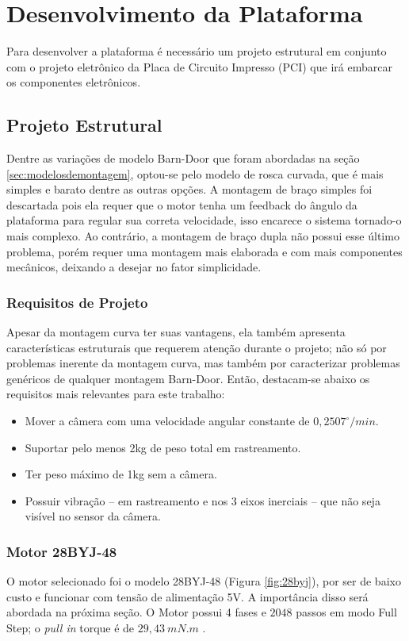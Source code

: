 \chapter{Desenvolvimento da Plataforma}

Para desenvolver a plataforma é necessário um projeto estrutural em conjunto com o projeto eletrônico da Placa de Circuito Impresso (PCI) que irá embarcar os componentes eletrônicos. 

\section{Projeto Estrutural}
Dentre as variações de modelo Barn-Door que foram abordadas na seção \ref{sec:modelosdemontagem}, optou-se pelo modelo de rosca curvada, que é mais simples e barato dentre as outras opções. A montagem de braço simples foi descartada pois ela requer que o motor tenha um feedback do ângulo da plataforma para regular sua correta velocidade, isso encarece o sistema tornado-o mais complexo. Ao contrário, a montagem de braço dupla não possui esse último problema, porém requer uma montagem mais elaborada e com mais componentes mecânicos, deixando a desejar no fator simplicidade. 

\subsection{Requisitos de Projeto}
Apesar da montagem curva ter suas vantagens, ela também apresenta características estruturais que requerem atenção durante o projeto; não só por problemas inerente da montagem curva, mas também por caracterizar problemas genéricos de qualquer montagem Barn-Door. Então, destacam-se abaixo os requisitos mais relevantes para este trabalho:

\begin{itemize}
	\item Mover a câmera com uma velocidade angular constante de $ 0,2507^{\circ}/min $. 
	\item Suportar pelo menos 2kg de peso total em rastreamento. 
	\item Ter peso máximo de 1kg sem a câmera.
	\item Possuir vibração -- em rastreamento e nos 3 eixos inerciais -- que não seja visível no sensor da câmera.
\end{itemize}

\subsection{Motor 28BYJ-48}
O motor selecionado foi o modelo 28BYJ-48 (Figura \ref{fig:28byj}), por ser de baixo custo e funcionar com tensão de alimentação 5V. A importância disso será abordada na próxima seção. O Motor possui 4 fases e $ 2048 $ passos em modo Full Step; o \textit{pull in} torque é de $ 29,43~mN.m $ \cite{man:stepperMotor}.

